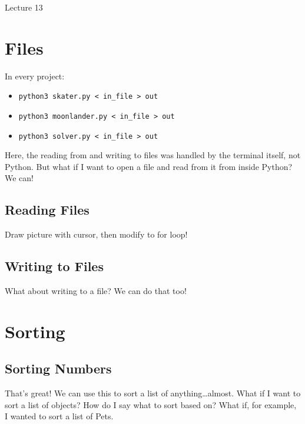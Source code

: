 \documentclass[12pt]{article}
\begin{document}
\begin{center}
   \LARGE Lecture 13
\end{center}

\section{Files}

In every project:

\begin{itemize}
   \item \lstinline{python3 skater.py < in_file > out}
   \item \lstinline{python3 moonlander.py < in_file > out}
   \item \lstinline{python3 solver.py < in_file > out}
\end{itemize}

Here, the reading from and writing to files was handled by the terminal itself,
not Python.  But what if I want to open a file and read from it from inside
Python?  We can!

\subsection{Reading Files}



\noindent
Draw picture with cursor, then modify to for loop!



\subsection{Writing to Files}

What about writing to a file?  We can do that too!



\section{Sorting}

\subsection{Sorting Numbers}



\noindent
That's great!  We can use this to sort a list of anything\dots almost.  What if
I want to sort a list of objects?  How do I say what to sort based on?  What
if, for example, I wanted to sort a list of Pets.
\end{document}
